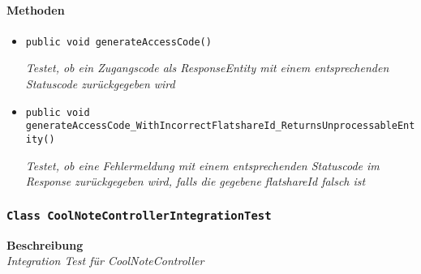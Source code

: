  \paragraph*{Methoden}
 \begin{itemize}
 	\item{\texttt{public void generateAccessCode()}}
 	
 	\textit{Testet, ob ein Zugangscode als ResponseEntity mit einem entsprechenden Statuscode zurückgegeben wird}
 	
 	\item{\texttt{public void generateAccessCode\_WithIncorrectFlatshareId\_Returns\-UnprocessableEntity()}}
 	
 	\textit{Testet, ob eine Fehlermeldung mit einem entsprechenden Statuscode im Response zurückgegeben wird, falls die gegebene flatshareId falsch ist}
 \end{itemize}
 
 \subsubsection{\texttt{Class CoolNoteControllerIntegrationTest}}
 \textbf{Beschreibung} \\
 \textit{Integration Test für CoolNoteController}
